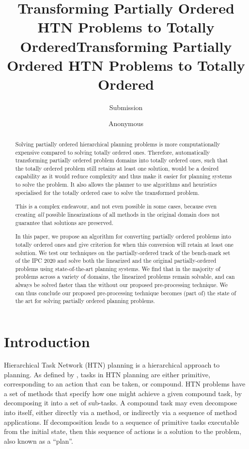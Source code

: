 \documentclass[letterpaper]{article} %
\author {
    Submission
}
\title{Transforming Partially Ordered HTN Problems to Totally Ordered}
\author {
    Anonymous

}
\title{Transforming Partially Ordered HTN Problems to Totally Ordered}
\begin{document}
\maketitle

\begin{abstract}
Solving partially ordered hierarchical planning problems is more computationally expensive compared to solving totally ordered ones. Therefore, automatically transforming partially ordered problem domains into totally ordered ones, such that the totally ordered problem still retains at least one solution, would be a desired capability as it would reduce complexity and thus make it easier for planning systems to solve the problem. It also allows the planner to use algorithms and heuristics specialised for the totally ordered case to solve the transformed problem. 

This is a complex endeavour, and not even possible in some cases, because even creating \emph{all} possible linearizations of all methods in the original domain does not guarantee that solutions are preserved. 

In this paper, we propose an algorithm for converting partially ordered problems into totally ordered ones and give criterion for when this conversion will retain at least one solution. We test our techniques on the partially-ordered track of the bench-mark set of the IPC 2020 and solve both the linearized and the original partially-ordered problems using state-of-the-art planning systems. We find that in the majority of problems across a variety of domains, the linearized problems remain solvable, and can always be solved faster than the without our proposed pre-processing technique. We can thus conclude our proposed pre-processing technique becomes (part of) the state of the art for solving partially ordered planning problems.
\end{abstract}
 
 
 
 
\section{Introduction}
Hierarchical Task Network (HTN) planning is a hierarchical approach to planning. As defined by \cite{HTNSurvey},  %
tasks in HTN planning are either primitive, corresponding to an action that can be taken, or compound. HTN problems have a set of methods that specify how one might achieve a given compound task, by decomposing it into a set of sub-tasks. A compound task may even decompose into itself, either directly via a method, or indirectly via a sequence of method applications. If decomposition leads to a sequence of primitive tasks executable from the initial state, then this sequence of actions is a solution to the problem, also known as a \enquote{plan}. 
\end{document}
